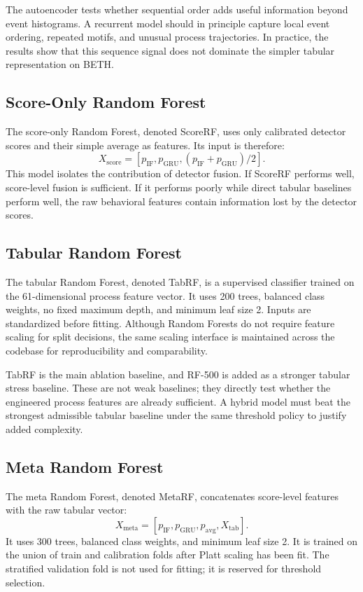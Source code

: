 \documentclass[journal]{IEEEtran}
\begin{document}
The autoencoder tests whether sequential order adds useful information beyond event histograms. A recurrent model should in principle capture local event ordering, repeated motifs, and unusual process trajectories. In practice, the results show that this sequence signal does not dominate the simpler tabular representation on BETH.

\subsection{Score-Only Random Forest}

The score-only Random Forest, denoted ScoreRF, uses only calibrated detector scores and their simple average as features. Its input is therefore:
\[
X_{\text{score}} = [p_{\text{IF}}, p_{\text{GRU}}, (p_{\text{IF}} + p_{\text{GRU}})/2].
\]
This model isolates the contribution of detector fusion. If ScoreRF performs well, score-level fusion is sufficient. If it performs poorly while direct tabular baselines perform well, the raw behavioral features contain information lost by the detector scores.

\subsection{Tabular Random Forest}

The tabular Random Forest, denoted TabRF, is a supervised classifier trained on the 61-dimensional process feature vector. It uses 200 trees, balanced class weights, no fixed maximum depth, and minimum leaf size 2. Inputs are standardized before fitting. Although Random Forests do not require feature scaling for split decisions, the same scaling interface is maintained across the codebase for reproducibility and comparability.

TabRF is the main ablation baseline, and RF-500 is added as a stronger tabular stress baseline. These are not weak baselines; they directly test whether the engineered process features are already sufficient. A hybrid model must beat the strongest admissible tabular baseline under the same threshold policy to justify added complexity.

\subsection{Meta Random Forest}

The meta Random Forest, denoted MetaRF, concatenates score-level features with the raw tabular vector:
\[
X_{\text{meta}} = [p_{\text{IF}}, p_{\text{GRU}}, p_{\text{avg}}, X_{\text{tab}}].
\]
It uses 300 trees, balanced class weights, and minimum leaf size 2. It is trained on the union of train and calibration folds after Platt scaling has been fit. The stratified validation fold is not used for fitting; it is reserved for threshold selection.
\end{document}
